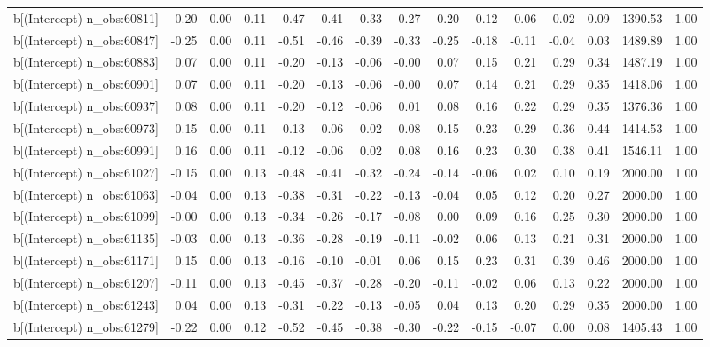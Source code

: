 \begin{table}[ht]
\begin{tabular}{rrrrrrrrrrrrrrr}
  b[(Intercept) n\_obs:60811] & -0.20 & 0.00 & 0.11 & -0.47 & -0.41 & -0.33 & -0.27 & -0.20 & -0.12 & -0.06 & 0.02 & 0.09 & 1390.53 & 1.00 \\ 
  b[(Intercept) n\_obs:60847] & -0.25 & 0.00 & 0.11 & -0.51 & -0.46 & -0.39 & -0.33 & -0.25 & -0.18 & -0.11 & -0.04 & 0.03 & 1489.89 & 1.00 \\ 
  b[(Intercept) n\_obs:60883] & 0.07 & 0.00 & 0.11 & -0.20 & -0.13 & -0.06 & -0.00 & 0.07 & 0.15 & 0.21 & 0.29 & 0.34 & 1487.19 & 1.00 \\ 
  b[(Intercept) n\_obs:60901] & 0.07 & 0.00 & 0.11 & -0.20 & -0.13 & -0.06 & -0.00 & 0.07 & 0.14 & 0.21 & 0.29 & 0.35 & 1418.06 & 1.00 \\ 
  b[(Intercept) n\_obs:60937] & 0.08 & 0.00 & 0.11 & -0.20 & -0.12 & -0.06 & 0.01 & 0.08 & 0.16 & 0.22 & 0.29 & 0.35 & 1376.36 & 1.00 \\ 
  b[(Intercept) n\_obs:60973] & 0.15 & 0.00 & 0.11 & -0.13 & -0.06 & 0.02 & 0.08 & 0.15 & 0.23 & 0.29 & 0.36 & 0.44 & 1414.53 & 1.00 \\ 
  b[(Intercept) n\_obs:60991] & 0.16 & 0.00 & 0.11 & -0.12 & -0.06 & 0.02 & 0.08 & 0.16 & 0.23 & 0.30 & 0.38 & 0.41 & 1546.11 & 1.00 \\ 
  b[(Intercept) n\_obs:61027] & -0.15 & 0.00 & 0.13 & -0.48 & -0.41 & -0.32 & -0.24 & -0.14 & -0.06 & 0.02 & 0.10 & 0.19 & 2000.00 & 1.00 \\ 
  b[(Intercept) n\_obs:61063] & -0.04 & 0.00 & 0.13 & -0.38 & -0.31 & -0.22 & -0.13 & -0.04 & 0.05 & 0.12 & 0.20 & 0.27 & 2000.00 & 1.00 \\ 
  b[(Intercept) n\_obs:61099] & -0.00 & 0.00 & 0.13 & -0.34 & -0.26 & -0.17 & -0.08 & 0.00 & 0.09 & 0.16 & 0.25 & 0.30 & 2000.00 & 1.00 \\ 
  b[(Intercept) n\_obs:61135] & -0.03 & 0.00 & 0.13 & -0.36 & -0.28 & -0.19 & -0.11 & -0.02 & 0.06 & 0.13 & 0.21 & 0.31 & 2000.00 & 1.00 \\ 
  b[(Intercept) n\_obs:61171] & 0.15 & 0.00 & 0.13 & -0.16 & -0.10 & -0.01 & 0.06 & 0.15 & 0.23 & 0.31 & 0.39 & 0.46 & 2000.00 & 1.00 \\ 
  b[(Intercept) n\_obs:61207] & -0.11 & 0.00 & 0.13 & -0.45 & -0.37 & -0.28 & -0.20 & -0.11 & -0.02 & 0.06 & 0.13 & 0.22 & 2000.00 & 1.00 \\ 
  b[(Intercept) n\_obs:61243] & 0.04 & 0.00 & 0.13 & -0.31 & -0.22 & -0.13 & -0.05 & 0.04 & 0.13 & 0.20 & 0.29 & 0.35 & 2000.00 & 1.00 \\ 
  b[(Intercept) n\_obs:61279] & -0.22 & 0.00 & 0.12 & -0.52 & -0.45 & -0.38 & -0.30 & -0.22 & -0.15 & -0.07 & 0.00 & 0.08 & 1405.43 & 1.00 \\ 

\end{tabular}
\end{table}

